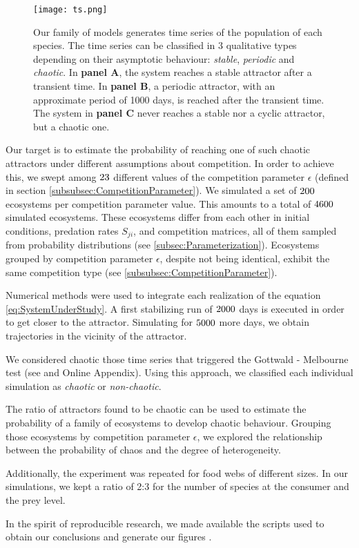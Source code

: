 \begin{figure}
	\begin{center}
		\texttt{[image: ts.png]}
	\end{center}
	\caption{Our family of models generates time series of the population of each species. The time series can be classified in $3$ qualitative types depending on their asymptotic behaviour: \textit{stable}, \textit{periodic} and \textit{chaotic}. In \textbf{panel A}, the system reaches a stable attractor after a transient time. In \textbf{panel B}, a periodic attractor, with an approximate period of 1000 days, is reached after the transient time. The system in \textbf{panel C} never reaches a stable nor a cyclic attractor, but a chaotic one.}
	\label{fig:TimeSeries}
\end{figure}

Our target is to estimate the probability of reaching one of such chaotic attractors under different assumptions about competition. In order to achieve this, we swept among $23$ different values of the competition parameter $\epsilon$ (defined in section \ref{subsubsec:CompetitionParameter}). We simulated a set of $200$ ecosystems per competition parameter value. This amounts to a total of $4600$ simulated ecosystems. These ecosystems differ from each other in initial conditions, predation rates $S_{ji}$, and competition matrices, all of them sampled from probability distributions (see \ref{subsec:Parameterization}). Ecosystems grouped by competition parameter $\epsilon$, despite not being identical, exhibit the same competition type (see \ref{subsubsec:CompetitionParameter}).

Numerical methods were used to integrate each realization of the equation \ref{eq:SystemUnderStudy}. A first stabilizing run of $ 2000 $ days is executed in order to get closer to the attractor. Simulating for $ 5000 $ more days, we obtain trajectories in the vicinity of the attractor.

We considered chaotic those time series that triggered the Gottwald - Melbourne test (see\cite{Gottwald2009} and Online Appendix). Using this approach, we classified each individual simulation as \textit{chaotic} or \textit{non-chaotic}.

The ratio of attractors found to be chaotic can be used to estimate the probability of a family of ecosystems to develop chaotic behaviour. Grouping those ecosystems by competition parameter $\epsilon$, we explored the relationship between the probability of chaos and the degree of heterogeneity.

Additionally, the experiment was repeated for food webs of different sizes. In our simulations, we kept a ratio of 2:3 for the number of species at the consumer and the prey level.

In the spirit of reproducible research, we made available the scripts used to obtain our conclusions and generate our figures \cite{Rodriguez-Sanchez-code-neuchaos}.